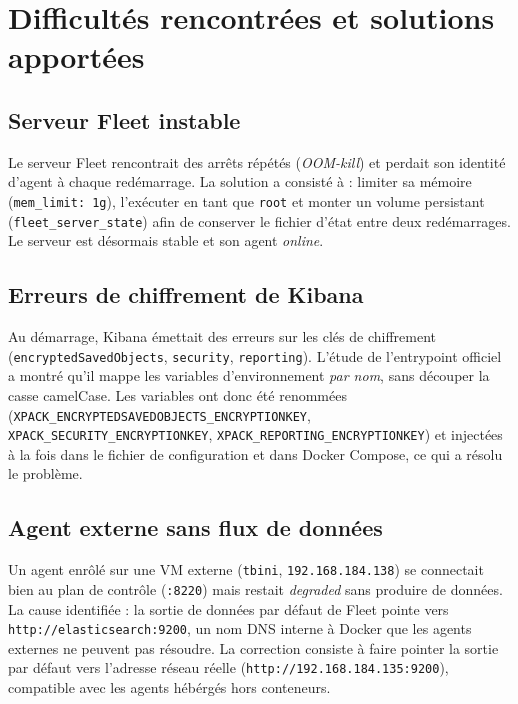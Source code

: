 
\section{Difficult\'es rencontr\'ees et solutions apport\'ees}

\subsection{Serveur Fleet instable}

Le serveur Fleet rencontrait des arr\^ets r\'ep\'et\'es (\emph{OOM-kill}) et
perdait son identit\'e d'agent \`a chaque red\'emarrage. La solution a
consist\'e \`a : limiter sa m\'emoire (\texttt{mem\_limit: 1g}), l'ex\'ecuter
en tant que \texttt{root} et monter un volume persistant
(\texttt{fleet\_server\_state}) afin de conserver le fichier d'\'etat entre
deux red\'emarrages. Le serveur est d\'esormais stable et son agent
\emph{online}.

\subsection{Erreurs de chiffrement de Kibana}

Au d\'emarrage, Kibana \'emettait des erreurs sur les cl\'es de chiffrement
(\texttt{encryptedSavedObjects}, \texttt{security}, \texttt{reporting}).
L'\'etude de l'entrypoint officiel a montr\'e qu'il mappe les variables
d'environnement \emph{par nom}, sans d\'ecouper la casse camelCase. Les
variables ont donc \'et\'e renomm\'ees
(\texttt{XPACK\_ENCRYPTEDSAVEDOBJECTS\_ENCRYPTIONKEY},
\texttt{XPACK\_SECURITY\_ENCRYPTIONKEY},
\texttt{XPACK\_REPORTING\_ENCRYPTIONKEY}) et inject\'ees \`a la fois dans le
fichier de configuration et dans Docker Compose, ce qui a r\'esolu le
probl\`eme.

\subsection{Agent externe sans flux de donn\'ees}

Un agent enr\^ol\'e sur une VM externe (\texttt{tbini},
\texttt{192.168.184.138}) se connectait bien au plan de contr\^ole
(\texttt{:8220}) mais restait \emph{degraded} sans produire de donn\'ees. La
cause identifi\'ee : la sortie de donn\'ees par d\'efaut de Fleet pointe vers
\texttt{http://elasticsearch:9200}, un nom DNS interne \`a Docker que les
agents externes ne peuvent pas r\'esoudre. La correction consiste \`a faire
pointer la sortie par d\'efaut vers l'adresse r\'eseau r\'eelle
(\texttt{http://192.168.184.135:9200}), compatible avec les agents h\'eb\'erg\'es
hors conteneurs.


